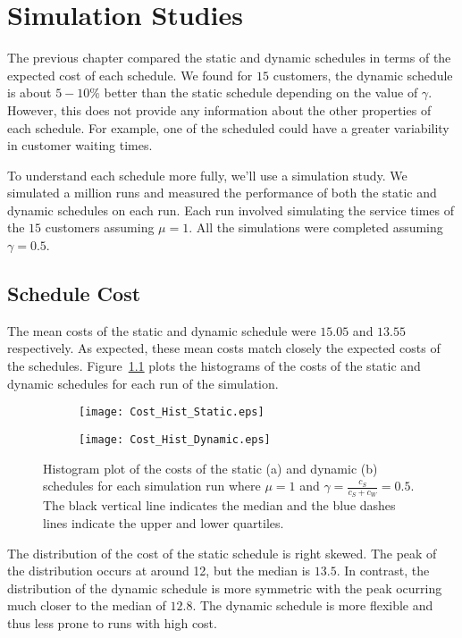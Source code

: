 \chapter{Simulation Studies}
\label{chap:Simulation}
The previous chapter compared the static and dynamic schedules in terms of the expected cost of each schedule. We found for $15$ customers, the dynamic schedule is about $5 - 10 \%$ better than the static schedule depending on the value of $\gamma$. However, this does not provide any information about the other properties of each schedule. For example, one of the scheduled could have a greater variability in customer waiting times.

To understand each schedule more fully, we'll use a simulation study. We simulated a million runs and measured the performance of both the static and dynamic schedules on each run. Each run involved simulating the service times of the $15$ customers assuming $\mu = 1$. All the simulations were completed assuming $\gamma = 0.5$.

\section{Schedule Cost}
The mean costs of the static and dynamic schedule were $15.05$ and $13.55$ respectively. As expected, these mean costs match closely the expected costs of the schedules. Figure~\ref{fig:Two_Cost} plots the histograms of the costs of the static and dynamic schedules for each run of the simulation.
\begin{figure}[htb]
	\centering
	\begin{subfigure}[t]{0.45\textwidth}
		\centering
		\texttt{[image: Cost\_Hist\_Static.eps]}
		\caption{}
	\end{subfigure}
	\begin{subfigure}[t]{0.45\textwidth}
		\centering
		\texttt{[image: Cost\_Hist\_Dynamic.eps]}
		\caption{}
	\end{subfigure}
	\caption{Histogram plot of the costs of the static (a) and dynamic (b) schedules for each simulation run where $\mu = 1$ and $\gamma = \frac{c_{S}}{c_{S} + c_{W}} = 0.5$. The black vertical line indicates the median and the blue dashes lines indicate the upper and lower quartiles.}
	\label{fig:Two_Cost}
\end{figure}

The distribution of the cost of the static schedule is right skewed. The peak of the distribution occurs at around 12, but the median is $13.5$. In contrast, the distribution of the dynamic schedule is more symmetric with the peak ocurring much closer to the median of $12.8$. The dynamic schedule is more flexible and thus less prone to runs with high cost.

